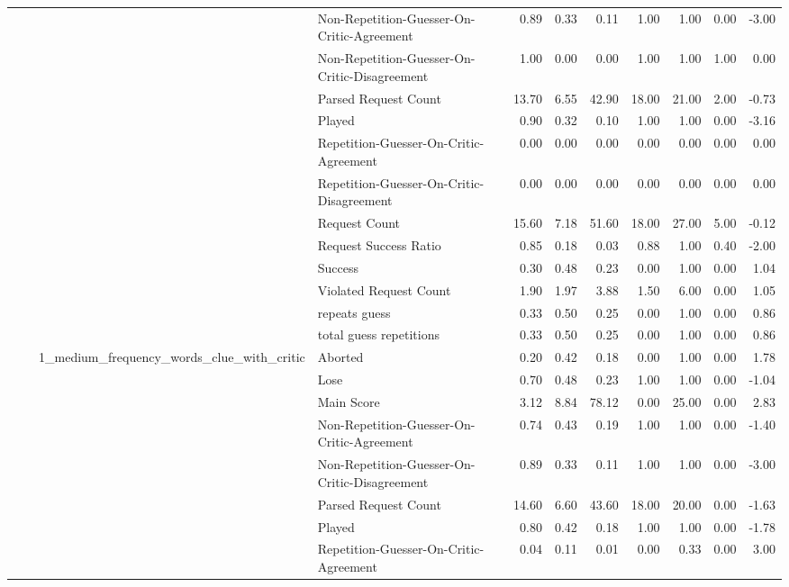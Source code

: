 \begin{tabular}{llllrrrrrrr}
 &  &  & Non-Repetition-Guesser-On-Critic-Agreement & 0.89 & 0.33 & 0.11 & 1.00 & 1.00 & 0.00 & -3.00 \\
 &  &  & Non-Repetition-Guesser-On-Critic-Disagreement & 1.00 & 0.00 & 0.00 & 1.00 & 1.00 & 1.00 & 0.00 \\
 &  &  & Parsed Request Count & 13.70 & 6.55 & 42.90 & 18.00 & 21.00 & 2.00 & -0.73 \\
 &  &  & Played & 0.90 & 0.32 & 0.10 & 1.00 & 1.00 & 0.00 & -3.16 \\
 &  &  & Repetition-Guesser-On-Critic-Agreement & 0.00 & 0.00 & 0.00 & 0.00 & 0.00 & 0.00 & 0.00 \\
 &  &  & Repetition-Guesser-On-Critic-Disagreement & 0.00 & 0.00 & 0.00 & 0.00 & 0.00 & 0.00 & 0.00 \\
 &  &  & Request Count & 15.60 & 7.18 & 51.60 & 18.00 & 27.00 & 5.00 & -0.12 \\
 &  &  & Request Success Ratio & 0.85 & 0.18 & 0.03 & 0.88 & 1.00 & 0.40 & -2.00 \\
 &  &  & Success & 0.30 & 0.48 & 0.23 & 0.00 & 1.00 & 0.00 & 1.04 \\
 &  &  & Violated Request Count & 1.90 & 1.97 & 3.88 & 1.50 & 6.00 & 0.00 & 1.05 \\
 &  &  & repeats guess & 0.33 & 0.50 & 0.25 & 0.00 & 1.00 & 0.00 & 0.86 \\
 &  &  & total guess repetitions & 0.33 & 0.50 & 0.25 & 0.00 & 1.00 & 0.00 & 0.86 \\
\cline{3-11}
 &  & \multirow[t]{15}{*}{1_medium_frequency_words_clue_with_critic} & Aborted & 0.20 & 0.42 & 0.18 & 0.00 & 1.00 & 0.00 & 1.78 \\
 &  &  & Lose & 0.70 & 0.48 & 0.23 & 1.00 & 1.00 & 0.00 & -1.04 \\
 &  &  & Main Score & 3.12 & 8.84 & 78.12 & 0.00 & 25.00 & 0.00 & 2.83 \\
 &  &  & Non-Repetition-Guesser-On-Critic-Agreement & 0.74 & 0.43 & 0.19 & 1.00 & 1.00 & 0.00 & -1.40 \\
 &  &  & Non-Repetition-Guesser-On-Critic-Disagreement & 0.89 & 0.33 & 0.11 & 1.00 & 1.00 & 0.00 & -3.00 \\
 &  &  & Parsed Request Count & 14.60 & 6.60 & 43.60 & 18.00 & 20.00 & 0.00 & -1.63 \\
 &  &  & Played & 0.80 & 0.42 & 0.18 & 1.00 & 1.00 & 0.00 & -1.78 \\
 &  &  & Repetition-Guesser-On-Critic-Agreement & 0.04 & 0.11 & 0.01 & 0.00 & 0.33 & 0.00 & 3.00 \\

\end{tabular}
